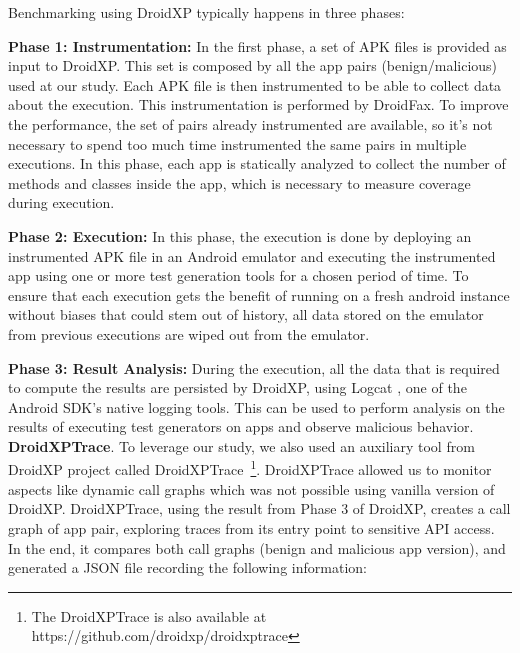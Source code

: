 Benchmarking using DroidXP typically happens in three phases:

\textbf{Phase 1: Instrumentation:} In the first phase, a set of APK files is provided as input to DroidXP. This set is composed by all the app pairs (benign/malicious) used at our study. Each APK file is then instrumented to be able to collect data about the execution. This instrumentation is performed by DroidFax. To improve the performance, the set of pairs already instrumented are available, so it's not necessary to spend too much time instrumented the same pairs in multiple executions. In this phase, each app is statically analyzed to collect the number of methods and classes inside the app, which is necessary to measure coverage during execution. %

\textbf{Phase 2: Execution:} In this phase, the execution is done by deploying an instrumented APK file in an Android emulator and executing the instrumented app using one or more test generation tools for a chosen period of time. To ensure that each execution gets the benefit of running on a fresh android instance without biases that could stem out of history, all data stored on the emulator from previous executions are wiped out from the emulator. 

\textbf{Phase 3: Result Analysis:} During the execution, all the data that is required to compute the results are persisted by DroidXP, using Logcat \cite{Logcat}, one of the Android SDK's native logging tools. This can be used to perform analysis on the results of executing test generators on apps and observe malicious behavior.\newline
\newline
\textbf{DroidXPTrace}. To leverage our study, we also used an auxiliary tool from DroidXP project called DroidXPTrace~\footnote{The DroidXPTrace is also available at https://github.com/droidxp/droidxptrace}. DroidXPTrace allowed us to monitor aspects like dynamic call graphs which was not possible using vanilla version of DroidXP. DroidXPTrace, using the result from Phase 3 of DroidXP, creates a call graph of app pair, exploring traces from its entry point to sensitive API access. In the end, it compares both call graphs (benign and malicious app version), and generated a JSON file recording the following information:

